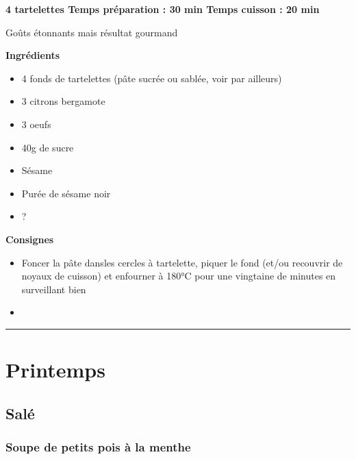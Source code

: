 \documentclass[]{book}
\providecommand{\tightlist}{%
  \setlength{\itemsep}{0pt}\setlength{\parskip}{0pt}}
\begin{document}
\begin{sucrebox}
\textbf{4 tartelettes \textbar{} Temps préparation : 30 min \textbar{}
Temps cuisson : 20 min}

Goûts étonnants mais résultat gourmand
\end{sucrebox}

\textbf{Ingrédients}

\begin{itemize}
\tightlist
\item
  4 fonds de tartelettes (pâte sucrée ou sablée, voir par ailleurs)
\item
  3 citrons bergamote
\item
  3 oeufs
\item
  40g de sucre
\item
  Sésame
\item
  Purée de sésame noir
\item
  ?
\end{itemize}

\textbf{Consignes}

\begin{itemize}
\item
  Foncer la pâte dansles cercles à tartelette, piquer le fond (et/ou recouvrir de noyaux de cuisson) et enfourner à 180°C pour une vingtaine de minutes en surveillant bien
\item
\end{itemize}

\begin{center}\rule{0.5\linewidth}{0.5pt}\end{center}

\hypertarget{printemps}{%
\chapter*{Printemps}\label{printemps}}

\hypertarget{saluxe9-1}{%
\section*{Salé}\label{saluxe9-1}}

\hypertarget{soupe-de-petits-pois-uxe0-la-menthe}{%
\subsection*{\texorpdfstring{{Soupe de petits pois à la menthe}}{Soupe de petits pois à la menthe}}\label{soupe-de-petits-pois-uxe0-la-menthe}}
\end{document}
